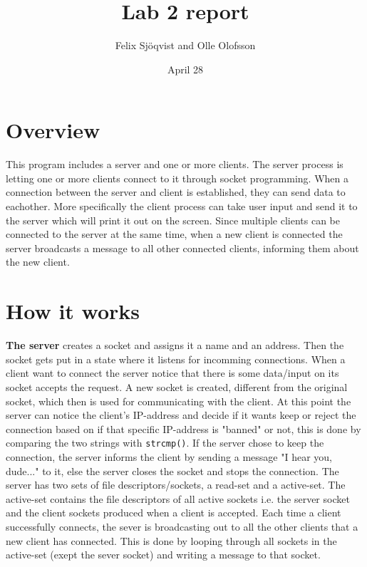 \documentclass{article}
\title{Lab 2 report}
\author{Felix Sjöqvist and Olle Olofsson}
\date{April 28}
\begin{document}
\maketitle
\section{Overview}
This program includes a server and one or more clients. The server process is letting one or more clients connect to it through socket programming. When a connection between the server and client is established, they can send data to eachother. More specifically the client process can take user input and send it to the server which will print it out on the screen. Since multiple clients can be connected to the server at the same time, when a new client is connected the server broadcasts a message to all other connected clients, informing them about the new client.



\section{How it works}
\textbf{The server} creates a socket and assigns it a name and an address. Then the socket gets put in a state where it listens for incomming connections. When a client want to connect the server notice that there is some data/input on its socket accepts the request. A new socket is created, different from the original socket, which then is used for communicating with the client. At this point the server can notice the client's IP-address and decide if it wants keep or reject the connection based on if that specific IP-address is "banned" or not, this is done by comparing the two strings with \texttt{strcmp()}. If the server chose to keep the connection, the server informs the client by sending a message "I hear you, dude..." to it, else the server closes the socket and stops the connection. The server has two sets of file descriptors/sockets, a read-set and a active-set. The active-set contains the file descriptors of all active sockets i.e. the server socket and the client sockets produced when a client is accepted. Each time a client successfully connects, the sever is broadcasting out to all the other clients that a new client has connected. This is done by looping through all sockets in the active-set (exept the sever socket) and writing a message to that socket.
\end{document}
